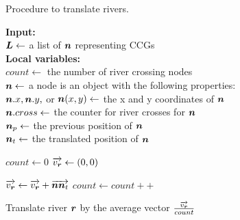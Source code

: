 \begin{algorithm}[tb!]
    \caption{Procedure to translate rivers.}\label{alg:TranslateRiver}
    \color{blue}
    \textbf{Input:} \\
    $ \bm{L} \gets $ a list of $ \bm{n} $ representing CCGs \\

    \textbf{Local variables:} \\
    $ count \gets $ the number of river crossing nodes \\
    $ \bm{n} \gets $ a node is an object with the following properties: \\
    \-\hspace{1em} $ \bm{n}.x, \bm{n}.y, $ or $ \bm{n}(x,y) \gets $ the x and y coordinates of $ \bm{n} $ \\
    \-\hspace{1em} $ \bm{n}.cross \gets $ the counter for river crosses for $ \bm{n} $ \\
    \-\hspace{1em} $ \bm{n}_{p} \gets $ the previous position of $ \bm{n} $ \\
    \-\hspace{1em} $ \bm{n}_t \gets $ the translated position of $ \bm{n} $ \\

    \begin{algorithmic}[1]
        \ForEach {$ \river \in \riverList $}
        \State $ count \gets 0 $
        \State $ \protect\overrightarrow{v_{\bm{r}}} \gets (0,0) $ 
        \ForEach {$ \node \in \nodeList $}

        \State $ \protect\overrightarrow{v_{\bm{r}}} \gets \protect\overrightarrow{v_{\bm{r}}} + \protect\overrightarrow{\bm{n}\bm{n}_t}$
        \State $ count \gets count ++ $
        \EndIf

        \EndIf

        \EndFor

        \State Translate river $ \bm{r} $ by the average vector $ \frac{\protect\overrightarrow{v_{\bm{r}}}}{count} $
        \EndFor

        \EndProcedure
    \end{algorithmic}
\end{algorithm}



